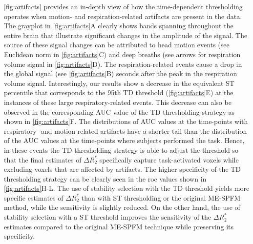 \cref{fig:artifacts} provides an in-depth view of how the time-dependent
thresholding operates when motion- and respiration-related artifacts are present
in the data. The grayplot \citep{Power2017simpleusefulway} in
\cref{fig:artifacts}A clearly shows bands spanning throughout the entire brain
that illustrate significant changes in the amplitude of the signal. The source
of these signal changes can be attributed to head motion events (see Euclidean
norm in \cref{fig:artifacts}C) and deep breaths (see arrows for respiration
volume signal \citep{Chang2009Influenceheartrate} in \cref{fig:artifacts}D). The
respiration-related events cause a drop in the global signal (see
\cref{fig:artifacts}B) seconds after the peak in the respiration volume signal.
Interestingly, our results show a decrease in the equivalent ST percentile that
corresponds to the 95th TD threshold (\cref{fig:artifacts}E) at the instances of
these large respiratory-related events. This decrease can also be observed in
the corresponding AUC value of the TD thresholding strategy as shown in
\cref{fig:artifacts}F. The distributions of AUC values at the time-points with
respiratory- and motion-related artifacts have a shorter tail than the
distribution of the AUC values at the time-points where subjects performed the
task. Hence, in these events the TD thresholding strategy is able to adjust the
threshold so that the final estimates of $\Delta R_2^*$ specifically capture
task-activated voxels while excluding voxels that are affected by artifacts. The
higher specificity of the TD thresholding strategy can be clearly seen in the
\acrshort*{roc} values shown in \cref{fig:artifacts}H-L. The use of stability
selection with the TD threshold yields more specific estimates of $\Delta R_2^*$
than with ST thresholding or the original ME-SPFM method, while the sensitivity
is slightly reduced. On the other hand, the use of stability selection with a ST
threshold improves the sensitivity of the $\Delta R_2^*$ estimates compared to
the original ME-SPFM technique while preserving its specificity.

